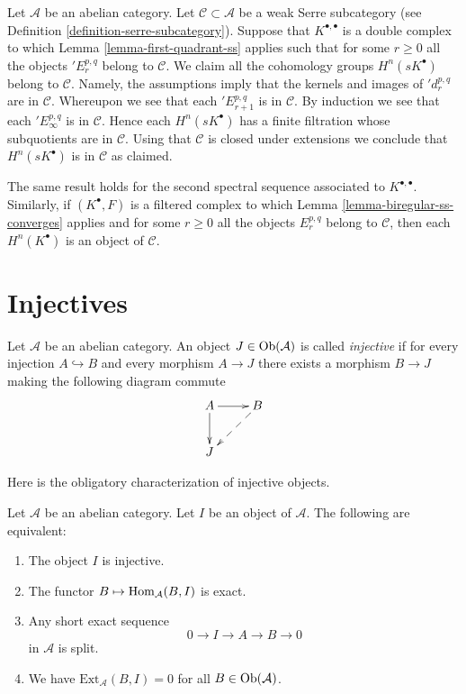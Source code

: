 \begin{remark}
\label{remark-weak-serre-subcategory}
Let $\mathcal{A}$ be an abelian category. Let $\mathcal{C} \subset \mathcal{A}$
be a weak Serre subcategory (see
Definition \ref{definition-serre-subcategory}).
Suppose that $K^{\bullet, \bullet}$ is a double complex to which
Lemma \ref{lemma-first-quadrant-ss}
applies such that for some $r \geq 0$ all the objects
${}'E_r^{p, q}$ belong to $\mathcal{C}$. We claim all the cohomology groups
$H^n(sK^\bullet)$ belong to $\mathcal{C}$. Namely, the assumptions imply
that the kernels and images of ${}'d_r^{p, q}$ are in $\mathcal{C}$.
Whereupon we see that each ${}'E_{r + 1}^{p, q}$ is in $\mathcal{C}$.
By induction we see that each ${}'E_\infty^{p, q}$ is in $\mathcal{C}$.
Hence each $H^n(sK^\bullet)$ has a finite filtration whose subquotients
are in $\mathcal{C}$. Using that $\mathcal{C}$ is closed under extensions
we conclude that $H^n(sK^\bullet)$ is in $\mathcal{C}$ as claimed.

\medskip\noindent
The same result holds for the second spectral sequence associated
to $K^{\bullet, \bullet}$. Similarly, if $(K^\bullet, F)$ is a filtered
complex to which
Lemma \ref{lemma-biregular-ss-converges}
applies and for some $r \geq 0$ all the objects $E_r^{p, q}$
belong to $\mathcal{C}$, then each $H^n(K^\bullet)$ is
an object of $\mathcal{C}$.
\end{remark}






\section{Injectives}
\label{section-injectives}

\begin{definition}
\label{definition-injective}
Let $\mathcal{A}$ be an abelian category.
An object $J \in \mathop{\rm Ob}\nolimits(\mathcal{A})$ is
called {\it injective} if for every injection
$A \hookrightarrow B$ and every morphism
$A \to J$ there exists a morphism $B \to J$ making
the following diagram commute
$$
\xymatrix{
A \ar[r] \ar[d] & B \ar@{-->}[ld] \\
J &
}
$$
\end{definition}

\noindent
Here is the obligatory characterization of injective objects.

\begin{lemma}
\label{lemma-characterize-injectives}
Let $\mathcal{A}$ be an abelian category.
Let $I$ be an object of $\mathcal{A}$.
The following are equivalent:
\begin{enumerate}
\item The object $I$ is injective.
\item The functor $B \mapsto \mathop{\rm Hom}\nolimits_\mathcal{A}(B, I)$
is exact.
\item Any short exact sequence
$$
0 \to I \to A \to B \to 0
$$
in $\mathcal{A}$ is split.
\item We have $\text{Ext}_\mathcal{A}(B, I) = 0$ for
all $B \in \mathop{\rm Ob}\nolimits(\mathcal{A})$.
\end{enumerate}
\end{lemma}

